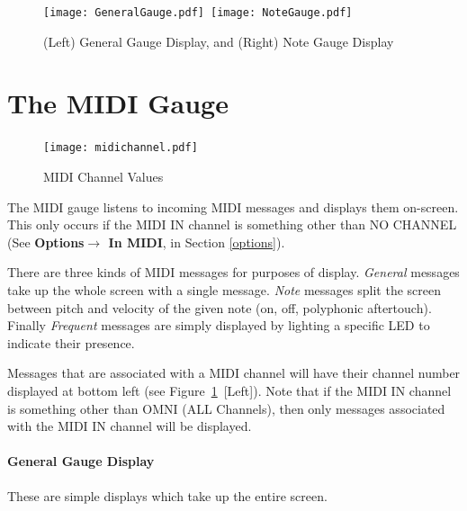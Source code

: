 \documentclass{article}
\begin{document}
\clearpage

\vspace{2em}
\begin{figure}[h!]
\begin{center}
\texttt{[image: GeneralGauge.pdf]}~\texttt{[image: NoteGauge.pdf]}
\caption{\small (Left) General Gauge Display, and (Right) Note Gauge Display}
\label{gaugedisplays} \end{center}
\vspace{-3em}\end{figure}


\section {The MIDI Gauge}


\begin{figure}
\vspace{-1.5em}\texttt{[image: midichannel.pdf]}
\vspace{-2em}\caption{\small MIDI Channel Values}
\label{midichannelvalues}
\end{figure}


The MIDI gauge listens to incoming MIDI messages and displays them on-screen.  This only occurs if the MIDI IN channel is something other than NO CHANNEL (See {\bf Options\(\boldsymbol\rightarrow\) In MIDI}, in Section \ref{options}).



There are three kinds of MIDI messages for purposes of display.  {\it General} messages take up the whole screen with a single message.  {\it Note} messages split the screen between pitch and velocity of the given note (on, off, polyphonic aftertouch).  Finally {\it Frequent} messages are simply displayed by lighting a specific LED to indicate their presence. 


Messages that are associated with a MIDI channel will have their channel number displayed at bottom left (see Figure~\ref{gaugedisplays}~[Left]).  Note that if the MIDI IN channel is something other than OMNI (ALL Channels), then only messages associated with the MIDI IN channel will be displayed.






\paragraph{General Gauge Display}  These are simple displays which take up the entire screen.
\end{document}
